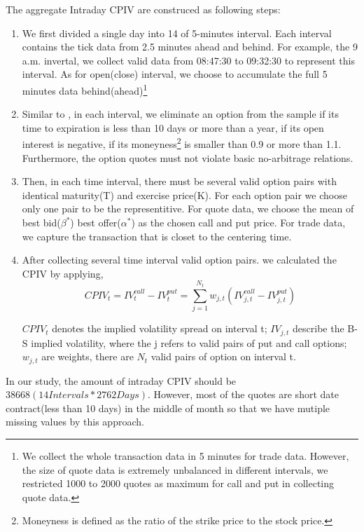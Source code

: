 The aggregate Intraday CPIV are construced as following steps: 
\begin{enumerate}
\item  We first divided a single day into 14 of 5-minutes interval. Each interval contains the tick data from 2.5 minutes ahead and behind. For example, the 9 a.m. invertal, we collect valid data from 08:47:30 to 09:32:30 to represent this interval. As for open(close) interval, we choose to accumulate the full 5 minutes data behind(ahead)\footnote{We collect the whole transaction data in 5 minutes for trade data. However, the size of quote data is extremely unbalanced in different intervals, we restricted 1000 to 2000 quotes as maximum for call and put in collecting quote data.}

\item Similar to \textcite{xing2010does}, in each interval, we eliminate an option from the sample if its time to expiration is less than 10 days or more than a year, if its open interest is negative, if its moneyness\footnote{Moneyness is defined as the ratio of the strike price to the stock price.} is smaller than 0.9 or more than 1.1. Furthermore, the option quotes must not violate basic no-arbitrage relations.

\item Then, in each time interval, there must be several valid option pairs with identical maturity(T) and exercise price(K). For each option pair we choose only one pair to be the representitive. For quote data, we choose the mean of best bid($\beta ^{\ast }$) best offer($\alpha ^{\ast }$) as the chosen call and put price. For trade data, we capture the transaction that is closet to the centering time.  

\item After collecting several time interval valid option pairs. we calculated the CPIV by applying, 
 \begin{equation}
CPIV_{t} = IV_{t}^{call} - IV_{t}^{put} = \sum_{j = 1}^{N_{t}}w_{j,t}(IV_{j,t}^{call} - IV_{j,t}^{put})
 \end{equation}
 
$CPIV_{t}$ denotes the implied volatility spread on interval t; $IV_{j,t}$ describe the B-S implied volatility, where the j refers to valid pairs of put and call options; $w_{j,t}$ are weights, there are $N_{t}$ valid pairs of option on interval t. 

\end{enumerate}

In our study, the amount of intraday CPIV should be $38668 (14 Intervals * 2762 Days)$. However, most of the quotes are short date contract(less than 10 days) in the middle of month so that we have mutiple missing values by this approach.






